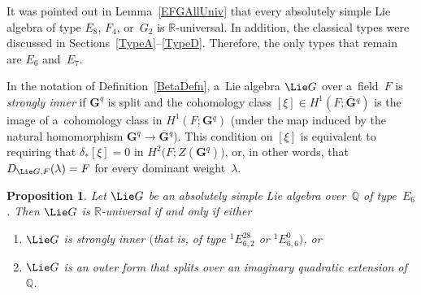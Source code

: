 \documentclass[pdftex]{sigma}
\numberwithin{equation}{section}
\newtheorem{prop}{Proposition}[section]
\begin{document}
It was pointed out in Lemma~\ref{EFGAllUniv} that every absolutely simple Lie algebra of type $E_8$, $F_4$, or~$G_2$ is
$\mathbb{R}$-universal.
In addition, the classical types were discussed in Sections~\ref{TypeA}--\ref{TypeD}.
Therefore, the only types that remain are $E_6$ and~$E_7$.

\begin{defn} In the notation of Def\/inition~\ref{BetaDefn}, a~Lie algebra $\Lie G$ over a~f\/ield~$F$ is
\emph{strongly inner} if $\mathbf{G}^q$ is split and the cohomology class $[\xi] \in H^1(F; \overline{\mathbf{G}}{}^q)$ is
the image of a~cohomology class in $H^1(F; \mathbf{G}{}^q)$ (under the map induced by the natural homomorphism
$\mathbf{G}{}^q \to \overline{\mathbf{G}}{}^q$).
This condition on $[\xi]$ is equivalent to requiring that $\delta_* [\xi] = 0$ in $H^2\bigl(F; Z(\mathbf{G}^q) \bigr)$,
or, in other words, that $D_{\Lie G, F}(\lambda) = F$ for every dominant weight~$\lambda$.
\end{defn}

\begin{prop}
Let $\Lie G$ be an absolutely simple Lie algebra over~$\mathbb{Q}$ of type~$E_6$.
Then $\Lie G$ is $\mathbb{R}$-universal if and only if either
\renewcommand{\labelenumi}{{\rm (\theenumi)}}
\begin{enumerate}\itemsep=0pt
\item $\Lie G$ is strongly inner $($that is, of type ${}^1 E^{28}_{6,2}$ or ${}^1 E^{0}_{6,6})$, or
\item $\Lie G$ is an outer form that splits over an imaginary quadratic extension of~$\mathbb{Q}$.
\end{enumerate}
\end{prop}
\end{document}
